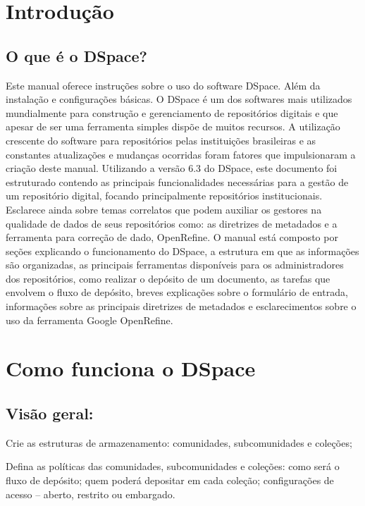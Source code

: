 \documentclass[12pt,hidelinks]{article}
\begin{document}
\section{Introdução}
\newpage
    \subsection{O que é o DSpace?}
        Este manual oferece instruções sobre o uso do software DSpace. Além da instalação e configurações básicas.
        O DSpace é um dos softwares mais utilizados mundialmente para construção e gerenciamento de repositórios digitais e que apesar de ser uma ferramenta simples dispõe de muitos recursos.
        \singlespacing
        A utilização crescente do software para repositórios pelas instituições brasileiras e as constantes atualizações e mudanças ocorridas foram fatores que impulsionaram a criação deste manual. 
         \singlespacing
         Utilizando a versão 6.3 do DSpace, este documento foi estruturado contendo as principais funcionalidades necessárias para a gestão de um repositório digital, focando principalmente repositórios institucionais. Esclarece ainda sobre temas correlatos que podem auxiliar os gestores na qualidade de dados de seus repositórios como: as diretrizes de metadados e a ferramenta para correção de dado, OpenRefine.
        \singlespacing
        O manual está composto por seções explicando o funcionamento do DSpace, a estrutura em que as informações são organizadas, as principais ferramentas disponíveis para os administradores dos repositórios, como realizar o depósito de um documento, as tarefas que envolvem o fluxo de depósito, breves explicações sobre o formulário de entrada, informações sobre as principais diretrizes de metadados e esclarecimentos sobre o uso da ferramenta Google OpenRefine.
\newpage
        \singlespacing
\section{Como funciona o DSpace}
\newpage
    \subsection{Visão geral:}
        \singlespacing \textbullet \hspace{6pt} Crie as estruturas de armazenamento: comunidades, subcomunidades e coleções;
        
        \textbullet \hspace{6pt} Defina as políticas das comunidades, subcomunidades e coleções: como será o fluxo de depósito; quem poderá depositar em cada coleção; configurações de acesso – aberto, restrito ou embargado.
\end{document}
